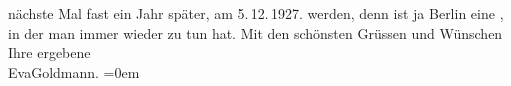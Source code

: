 \begin{ledgroupsized}[t]{13cm}
{{{                  nächste Mal fast ein Jahr später, am 5. 12. 1927.}}}\label{K_L03542-2h} werden, denn \label{K_L03542-3v}\label{K_L03542-3h} ist ja Berlin eine \label{T_L03542-1v}\label{T_L03542-1h}, in der man immer wieder zu tun hat.\pend
           \pstart
           Mit den schönsten Grüssen und Wünschen {\\[\baselineskip]}Ihre ergebene {\\[\baselineskip]}\spacefill\mbox{EvaGoldmann.}\pend
           \leftskip=0em{}
         
         \endnumbering{}\end{ledgroupsized}  \newcommand{\dateiname}{L03542}\newcommand{\titel}{Eva Marie Goldmann an Arthur Schnitzler, 1. 1. 1927}\newcommand{\editorInnen}{Martin Anton Müller und Laura Untner}
      
